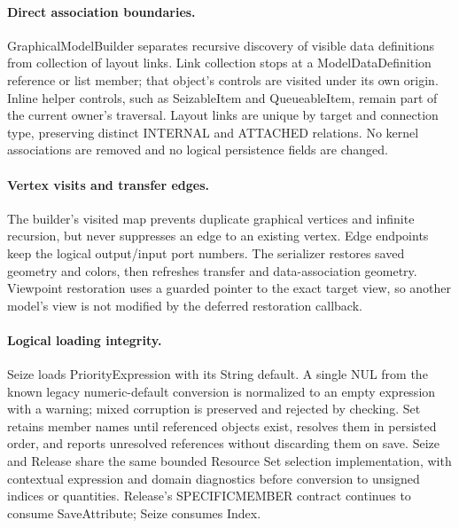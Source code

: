 \paragraph{Direct association boundaries.}
GraphicalModelBuilder separates recursive discovery of visible data definitions
from collection of layout links. Link collection stops at a ModelDataDefinition
reference or list member; that object's controls are visited under its own origin.
Inline helper controls, such as SeizableItem and QueueableItem, remain part of the
current owner's traversal. Layout links are unique by target and connection type,
preserving distinct INTERNAL and ATTACHED relations. No kernel associations are
removed and no logical persistence fields are changed.

\paragraph{Vertex visits and transfer edges.}
The builder's visited map prevents duplicate graphical vertices and infinite
recursion, but never suppresses an edge to an existing vertex. Edge endpoints keep
the logical output/input port numbers. The serializer restores saved geometry and
colors, then refreshes transfer and data-association geometry. Viewpoint restoration
uses a guarded pointer to the exact target view, so another model's view is not
modified by the deferred restoration callback.

\paragraph{Logical loading integrity.}
Seize loads PriorityExpression with its String default. A single NUL from the known
legacy numeric-default conversion is normalized to an empty expression with a
warning; mixed corruption is preserved and rejected by checking. Set retains member
names until referenced objects exist, resolves them in persisted order, and reports
unresolved references without discarding them on save. Seize and Release share the
same bounded Resource Set selection implementation, with contextual expression and
domain diagnostics before conversion to unsigned indices or quantities. Release's
SPECIFICMEMBER contract continues to consume SaveAttribute; Seize consumes Index.
